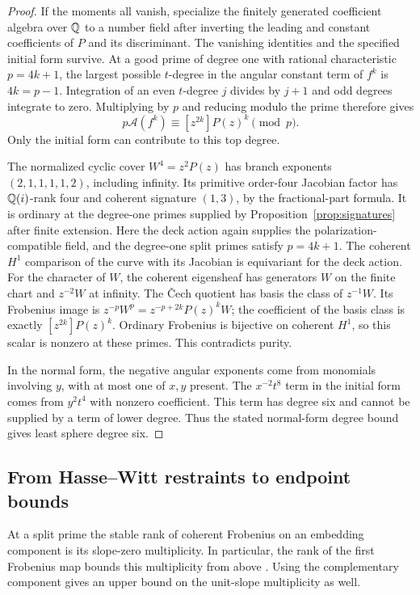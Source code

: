 \begin{proof}
If the moments all vanish, specialize the finitely generated
coefficient algebra over \(\mathbb Q\) to a number field after inverting
the leading and constant coefficients of \(P\) and its discriminant.
The vanishing identities and the specified initial form survive.
At a good prime of degree one with rational characteristic
\(p=4k+1\), the largest possible \(t\)-degree in the angular
constant term of \(f^k\) is \(4k=p-1\).
Integration of an even \(t\)-degree \(j\) divides by \(j+1\)
and odd degrees integrate to zero. Multiplying by \(p\) and
reducing modulo the prime therefore gives
\[
       p\mathcal A(f^k)\equiv [z^{2k}]P(z)^k\pmod p .
\]
Only the initial form can contribute to this top degree.

The normalized cyclic cover \(W^4=z^2P(z)\) has branch
exponents \((2,1,1,1,1,2)\), including infinity.
Its primitive order-four Jacobian factor has \(\mathbb Q(i)\)-rank
four and coherent signature \((1,3)\), by the fractional-part
formula. It is ordinary at the degree-one primes supplied by
Proposition~\ref{prop:signatures} after finite extension.
Here the deck action again supplies the polarization-compatible
field, and the degree-one split primes satisfy \(p=4k+1\).
The coherent \(H^1\) comparison of the curve with its Jacobian
is equivariant for the deck action.
For the character of \(W\), the coherent eigensheaf has generators
\(W\) on the finite chart and \(z^{-2}W\) at infinity. The
\v{C}ech quotient has basis the class of \(z^{-1}W\).
Its Frobenius image is
\(z^{-p}W^p=z^{-p+2k}P(z)^kW\); the coefficient of the basis class
is exactly \([z^{2k}]P(z)^k\). Ordinary Frobenius is bijective
on coherent \(H^1\), so this scalar is nonzero at these primes.
This contradicts purity.

In the normal form, the negative angular exponents come from
monomials involving \(y\), with at most one of \(x,y\) present.
The \(x^{-2}t^8\) term in the initial form comes from \(y^2t^4\)
with nonzero coefficient. This term has degree six and cannot
be supplied by a term of lower degree. Thus the stated normal-form
degree bound gives least sphere degree six.
\end{proof}

\subsection{From Hasse--Witt restraints to endpoint bounds}

At a split prime the stable rank of coherent Frobenius on an
embedding component is its slope-zero multiplicity. In
particular, the rank of the first Frobenius map bounds this
multiplicity from above \cite[Definition~2.1 and Lemma~2.2]{bouw}.
Using the complementary component gives an upper bound on the
unit-slope multiplicity as well.

